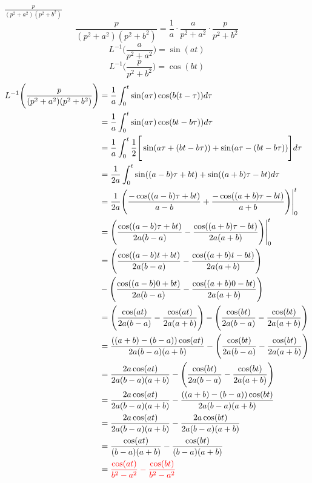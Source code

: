 \item[11.]$\frac{p}{(p^2+a^2)(p^2+b^2)}$
\[
    \frac{p}{(p^2+a^2)(p^2+b^2)} = \frac{1}{a}\cdot\frac{a}{p^2+a^2}\cdot\frac{p}{p^2+b^2}
\]
\begin{equation*}
    L^{-1}\Bigg(\frac{a}{p^2+a^2}\Bigg) 
    = \sin(at)
    \tag{By \( L3 \)}
\end{equation*}
\begin{equation*}
    L^{-1}\Bigg(\frac{p}{p^2+b^2}\Bigg) 
    = \cos(bt)
    \tag{By \( L4 \)}
\end{equation*}
\begin{align*}
    L^{-1}\Bigg( \frac{p}{(p^2+a^2)(p^2+b^2)} \Bigg)
    & = \frac{1}{a}\int_0^t \sin(a\tau)\cos(b(t-\tau))d\tau\\
     & = \frac{1}{a}\int_0^t \sin(a\tau)\cos(bt-b\tau))d\tau\\
    & = \frac{1}{a}\int_0^t \frac{1}{2}\Bigg[ \sin(a\tau+(bt-b\tau))+\sin(a\tau-(bt-b\tau))
    \Bigg]d\tau\\
    & = \frac{1}{2a} \int_0^t \sin((a-b)\tau+bt)+\sin((a+b)\tau-bt)d\tau\\
    & = \frac{1}{2a} \Bigg( \frac{-\cos((a-b)\tau+bt)}{a-b}+\frac{-\cos((a+b)\tau-bt)}{a+b}\Bigg)\Bigg|^t_0\\
    & =\Bigg(\frac{\cos((a-b)\tau+bt)}{2a(b-a)}-\frac{\cos((a+b)\tau-bt)}{2a(a+b)}\Bigg)\Bigg|^t_0\\
    & =\Bigg(\frac{\cos((a-b)t+bt)}{2a(b-a)}-\frac{\cos((a+b)t-bt)}{2a(a+b)}\Bigg)\\
    & -\Bigg(\frac{\cos((a-b)0+bt)}{2a(b-a)}-\frac{\cos((a+b)0-bt)}{2a(a+b)}\Bigg)\\
    & =\Bigg(\frac{\cos(at)}{2a(b-a)}-\frac{\cos(at)}{2a(a+b)}\Bigg)
    -\Bigg(\frac{\cos(bt)}{2a(b-a)}-\frac{\cos(bt)}{2a(a+b)}\Bigg)\\
    & = \frac{((a+b)-(b-a))\cos(at)}{2a(b-a)(a+b)}-\Bigg(\frac{\cos(bt)}{2a(b-a)}-\frac{\cos(bt)}{2a(a+b)}\Bigg)\\
    & = \frac{2a\cos(at)}{2a(b-a)(a+b)}-\Bigg(\frac{\cos(bt)}{2a(b-a)}-\frac{\cos(bt)}{2a(a+b)}\Bigg)\\
    & = \frac{2a\cos(at)}{2a(b-a)(a+b)}-\frac{((a+b)-(b-a))\cos(bt)}{2a(b-a)(a+b)}\\
    & = \frac{2a\cos(at)}{2a(b-a)(a+b)}-\frac{2a\cos(bt)}{2a(b-a)(a+b)}\\
    & = \frac{\cos(at)}{(b-a)(a+b)}-\frac{\cos(bt)}{(b-a)(a+b)}\\
    & = \textcolor{red}{\frac{\cos(at)}{b^2-a^2}-\frac{\cos(bt)}{b^2-a^2}}\\
\end{align*}